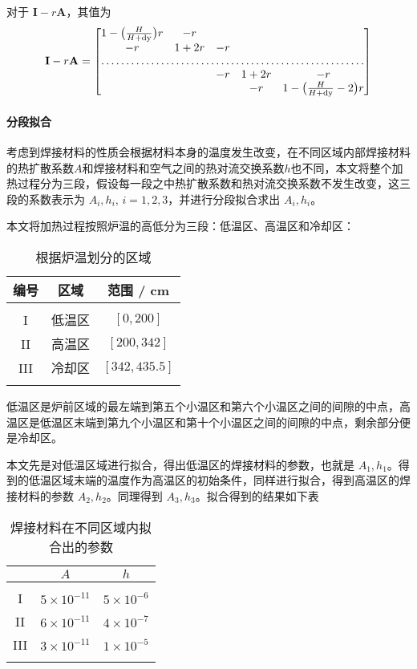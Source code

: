 \documentclass[../main.tex]{subfiles}
\begin{document}
对于 \(\mathbf{I} - r \mathbf{A}\)，其值为
\begin{equation}
\mathbf{I} - r \mathbf{A} =
\begin{bmatrix}
1 - \big(\frac{H}{H + \mathrm{dy}}\big) r & -r \\
-r & 1 + 2r & -r \\
\hdotsfor{5}\\
&&-r & 1 + 2r & -r \\
&&& -r & 1 - \big(\frac{ H }{ H + \mathrm{dy}}- 2\big) r
\end{bmatrix}
\end{equation}

\paragraph{分段拟合} 考虑到焊接材料的性质会根据材料本身的温度发生改变，在不同区域内部焊接材料的热扩散系数\(A\)和焊接材料和空气之间的热对流交换系数\(h\)也不同，本文将整个加热过程分为三段，假设每一段之中热扩散系数和热对流交换系数不发生改变，这三段的系数表示为 \(A_{i}, h_{i}\), \(i = 1 , 2 ,3 \)，并进行分段拟合求出 \(A_{i} ,h_{i}\)。

本文将加热过程按照炉温的高低分为三段：低温区、高温区和冷却区：
\begin{table}[H]
\centering
\begin{tabular}{ccc}
编号&区域 & 范围 / cm \\ \hline \hline
\\ [-1em]
I&低温区& \([0 , 200]\) \\
II&高温区& \([200, 342]\) \\
III&冷却区& \([342, 435.5]\) 
\\ [-1em]
\\ \hline
\end{tabular}\caption{根据炉温划分的区域}
\end{table}
低温区是炉前区域的最左端到第五个小温区和第六个小温区之间的间隙的中点，高温区是低温区末端到第九个小温区和第十个小温区之间的间隙的中点，剩余部分便是冷却区。

本文先是对低温区域进行拟合，得出低温区的焊接材料的参数，也就是 \(A_{1}, h_{1}\)。得到的低温区域末端的温度作为高温区的初始条件，同样进行拟合，得到高温区的焊接材料的参数 \(A_{2}, h_{2}\)。同理得到 \(A_{3}, h_{3}\)。拟合得到的结果如下表
\begin{table}[H]
\centering
\begin{tabular}{ccc}
& \(A\) & \(h\) \\ \hline \hline
\\[-1em]
I & \(5 \times 10 ^{-11}\) & \(5 \times 10 ^{-6}\) \\ 
II & \(6 \times 10 ^{-11}\) & \(4 \times 10 ^{-7}\) \\
III & \(3 \times 10 ^{-11}\) & \(1 \times 10 ^{-5}\) 
\\[-1em]
\\ \hline
\end{tabular}\caption{焊接材料在不同区域内拟合出的参数}
\end{table}
\end{document}
